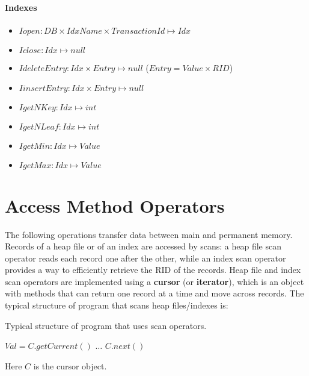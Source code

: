\paragraph{Indexes}

\begin{itemize}
    \item $Iopen : DB \times IdxName \times TransactionId \mapsto Idx$

    \item $Iclose : Idx \mapsto null$

    \item $IdeleteEntry : Idx \times Entry \mapsto null$ ($Entry = Value \times RID$)

    \item $IinsertEntry : Idx \times Entry \mapsto null$
    
    \item $IgetNKey : Idx \mapsto int$
    
    \item $IgetNLeaf : Idx \mapsto int$

    \item $IgetMin : Idx \mapsto Value$

    \item $IgetMax : Idx \mapsto Value$
\end{itemize}

\section{Access Method Operators}

The following operations transfer data between main and permanent memory. Records of a heap file or of an index are accessed by scans: a heap file scan operator reads each record one after the other, while an index scan operator provides a way to efficiently retrieve the RID of the records. Heap file and index scan operators are implemented using a \textbf{cursor} (or \textbf{iterator}), which is an object with methods that can return one record at a time and move across records. The typical structure of program that scans heap files/indexes is:
\begin{algorithm}
\caption{Typical structure of program that uses scan operators.}
\begin{algorithmic}[1]
        \State $Val = C.getCurrent()$
        \State $\dots$
        \State $C.next()$
    \EndWhile
\end{algorithmic}
\end{algorithm}
Here $C$ is the cursor object.

